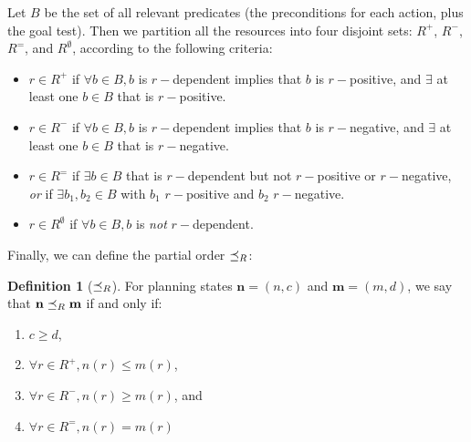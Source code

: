 \documentclass[letterpaper]{article}
\theoremstyle{plain} \newtheorem{theorem}{Theorem} \newtheorem{proposition}{Proposition} \newtheorem{lemma}{Lemma}
\theoremstyle{definition} \newtheorem{definition}{Definition} \newtheorem{conjecture}{Conjecture} \newtheorem*{example}{Example}
\theoremstyle{remark} \newtheorem*{remark}{Remark} \newtheorem*{note}{Note} \newtheorem{case}{Case}
\begin{document}
Let $B$ be the set of all relevant predicates (the preconditions for each action, plus the goal test). Then we partition all the resources into four disjoint sets: $R^+$, $R^-$, $R^=$, and $R^\emptyset$, according to the following criteria:
\begin{itemize}
	\item $r \in R^+$ if $\forall b \in B, b$ is $r-$dependent implies that $b$ is $r-$positive, and $\exists$ at least one $b \in B$ that is $r-$positive.
	\item $r \in R^-$ if $\forall b \in B, b$ is $r-$dependent implies that $b$ is $r-$negative, and $\exists$ at least one $b \in B$ that is $r-$negative.
	\item $r \in R^=$ if $\exists b \in B$ that is $r-$dependent but not $r-$positive or $r-$negative, \emph{or} if $\exists b_1, b_2 \in B$ with $b_1$ $r-$positive and $b_2$ $r-$negative.
	\item $r \in R^\emptyset$ if $\forall b \in B, b$ is \emph{not} $r-$dependent.
\end{itemize}

Finally, we can define the partial order $\preceq_R$:
\begin{definition}[$\preceq_R$]
	\label{def-po}
	For planning states $\textbf{n} = (n, c)$ and $\textbf{m} = (m, d)$, we say that $\textbf{n} \preceq_R \textbf{m}$ if and only if:
	\begin{enumerate}
		\item $c \ge d$,
		\item $\forall r \in R^+, n(r) \le m(r)$,
		\item $\forall r \in R^-, n(r) \ge m(r)$, and
		\item $\forall r \in R^=, n(r) = m(r)$
	\end{enumerate}
\end{definition}
\end{document}
